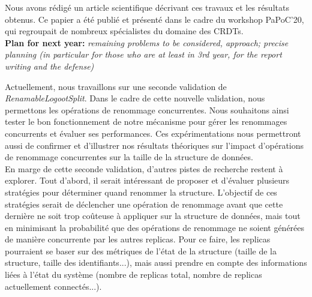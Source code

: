 \documentclass[12pt]{article}
\newcommand{\commentaire}[1]{\small\textit{#1}}
\begin{document}
Nous avons rédigé un article scientifique décrivant ces travaux et les résultats obtenus. Ce papier a été publié et présenté dans le cadre du workshop PaPoC'20, qui regroupait de nombreux spécialistes du domaine des \acp{CRDT}.
\\

\noindent\textbf{Plan for next year:}
\commentaire{%
  remaining problems to be considered, approach; precise planning (in
  particular for those who are at least in 3rd year, for the report
  writing and the defense)\\}


Actuellement, nous travaillons sur une seconde validation de \emph{RenamableLogootSplit}. Dans le cadre de cette nouvelle validation, nous permettons les opérations de renommage concurrentes.
Nous souhaitons ainsi tester le bon fonctionnement de notre mécanisme pour gérer les renommages concurrents et évaluer ses performances.
Ces expérimentations nous permettront aussi de confirmer et d'illustrer nos résultats théoriques sur l'impact d'opérations de renommage concurrentes sur la taille de la structure de données.
\\

En marge de cette seconde validation, d'autres pistes de recherche restent à explorer.
Tout d'abord, il serait intéressant de proposer et d'évaluer plusieurs stratégies pour déterminer quand renommer la structure.
L'objectif de ces stratégies serait de déclencher une opération de renommage avant que cette dernière ne soit trop coûteuse à appliquer sur la structure de données, mais tout en minimisant la probabilité que des opérations de renommage ne soient générées de manière concurrente par les autres replicas.
Pour ce faire, les replicas pourraient se baser sur des métriques de l'état de la structure (taille de la structure, taille des identifiants...), mais aussi prendre en compte des informations liées à l'état du système (nombre de replicas total, nombre de replicas actuellement connectés...).
\\
\end{document}
